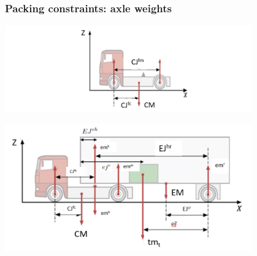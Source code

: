 \documentclass[10pt]{beamer}
\begin{document}
\begin{frame}
  \frametitle{Packing constraints: axle weights}

  \begin{center}
    \includegraphics[width=0.8\textwidth]{img/tractor_parameters.png}

    \includegraphics[width=0.8\textwidth]{img/trailer_parameters.png}
  \end{center}
  
\end{frame}
\end{document}

